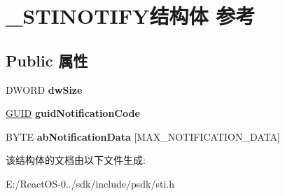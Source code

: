 \hypertarget{struct___s_t_i_n_o_t_i_f_y}{}\section{\+\_\+\+S\+T\+I\+N\+O\+T\+I\+F\+Y结构体 参考}
\label{struct___s_t_i_n_o_t_i_f_y}
\subsection*{Public 属性}
\begin{DoxyCompactItemize}
\item 
\mbox{\label{struct___s_t_i_n_o_t_i_f_y_a8bd07f178c2100fdad415c6b06754438}} 
D\+W\+O\+RD {\bfseries dw\+Size}
\item 
\mbox{\label{struct___s_t_i_n_o_t_i_f_y_ab332b19813b366af2f1c02401585b83a}} 
\hyperlink{interface_g_u_i_d}{G\+U\+ID} {\bfseries guid\+Notification\+Code}
\item 
\mbox{\label{struct___s_t_i_n_o_t_i_f_y_a76a96f02ddd0a48bacb1dab1f70d34af}} 
B\+Y\+TE {\bfseries ab\+Notification\+Data} \mbox{[}M\+A\+X\+\_\+\+N\+O\+T\+I\+F\+I\+C\+A\+T\+I\+O\+N\+\_\+\+D\+A\+TA\mbox{]}
\end{DoxyCompactItemize}


该结构体的文档由以下文件生成\+:\begin{DoxyCompactItemize}
\item 
E\+:/\+React\+O\+S-\/0../sdk/include/psdk/sti.\+h\end{DoxyCompactItemize}
